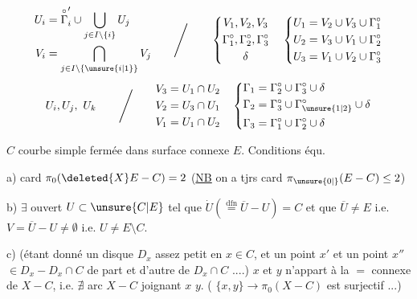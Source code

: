 \[
\begin{aligned}
 U_i&=\overset{\circ}{\Gamma}'_i\cup\bigcup_{j\in I\setminus\{i\}}U_j\\
 V_i&=\bigcap_{j\in I\setminus\{\unsure{i|1}\}}V_j
\end{aligned}
\qquad\Bigg/\qquad
\left\{\begin{gathered}
 V_1,V_2,V_3\\ \Gamma_1^\circ,\Gamma_2^\circ,\Gamma_3^\circ\\ \delta
\end{gathered}\right.
\quad
\left\{\begin{aligned}
 U_1&=V_2\cup V_3\cup\Gamma_1^\circ\\
 U_2&=V_3\cup V_1\cup\Gamma_2^\circ\\
 U_3&=V_1\cup V_2\cup\Gamma_3^\circ
\end{aligned}\right.
\]
\[
 U_i,U_j,\ U_k\qquad\Bigg/\qquad
\begin{aligned}
 V_3&=U_1\cap U_2\\
 V_2&=U_3\cap U_1\\
 V_1&=U_1\cap U_2
\end{aligned}
\quad
\left\{\begin{aligned}
 \Gamma_1&=\Gamma_2^\circ\cup\Gamma_3^\circ\cup\delta\\
 \Gamma_2&=\Gamma_3^\circ\cup\Gamma_{\unsure{1|2}}^\circ\cup\delta\\
 \Gamma_3&=\Gamma_1^\circ\cup\Gamma_2^\circ\cup\delta
\end{aligned}\right.
\]

$C$ courbe simple fermée dans surface connexe $E$. Conditions équ.

a) card $\pi_0(\deleted{X}E-C)=2$ \quad (\uline{NB} on a tjrs card $\pi_{\unsure{0|{}}}(E-C)\le 2$)

b) $\exists$ ouvert $U\subset\unsure{C|E}$ tel que $\dot U(\overset{\text{dfn}}{=}\overline U-U)=C$ et que 
$\overline U\ne E$ i.e. $V=\overline U-U\ne\emptyset$ i.e. $U\ne E\setminus C$.

c) (étant donné un disque $D_x$ assez petit  en $x\in C$\unsure{\}|)}, et un point $x'$ et un point $x''$ $\in D_x-D_x\cap C$ de part et d'autre de $D_x\cap C$ ....)
$x$ et $y$ n'appart  à la $=$  connexe de $X-C$, i.e. $\nexists$ arc  $X-C$ joignant $x$  $y$.
( $\{x,y\}\longrightarrow\pi_0(X-C)$ est surjectif ...)
